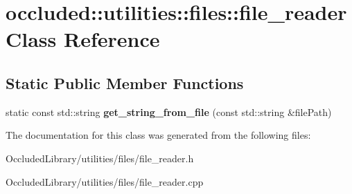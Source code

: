 \hypertarget{classoccluded_1_1utilities_1_1files_1_1file__reader}{\section{occluded\+:\+:utilities\+:\+:files\+:\+:file\+\_\+reader Class Reference}
\label{classoccluded_1_1utilities_1_1files_1_1file__reader}
}
\subsection*{Static Public Member Functions}
\begin{DoxyCompactItemize}
\item 
\hypertarget{classoccluded_1_1utilities_1_1files_1_1file__reader_aaae5be83e26fd8d591c25cd5d24ab919}{static const std\+::string {\bfseries get\+\_\+string\+\_\+from\+\_\+file} (const std\+::string \&file\+Path)}\label{classoccluded_1_1utilities_1_1files_1_1file__reader_aaae5be83e26fd8d591c25cd5d24ab919}

\end{DoxyCompactItemize}


The documentation for this class was generated from the following files\+:\begin{DoxyCompactItemize}
\item 
Occluded\+Library/utilities/files/file\+\_\+reader.\+h\item 
Occluded\+Library/utilities/files/file\+\_\+reader.\+cpp\end{DoxyCompactItemize}
